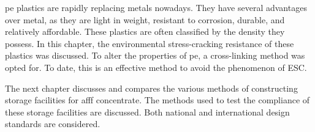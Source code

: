 \acrshort{pe} plastics are rapidly replacing metals nowadays. They have several advantages over metal, as they are light in weight, resistant to corrosion, durable, and relatively affordable. These plastics are often classified by the density they possess. In this chapter, the environmental stress-cracking resistance of these plastics was discussed. To alter the properties of \acrshort{pe}, a cross-linking method was opted for. To date, this is an effective method to avoid the phenomenon of ESC.

The next chapter discusses and compares the various methods of constructing storage facilities for \acrshort{afff} concentrate. The methods used to test the compliance of these storage facilities are discussed. Both national and international design standards are considered.